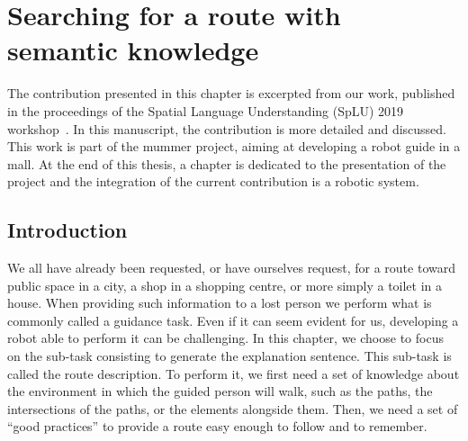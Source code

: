 \ifdefined{}
\else
\setcounter{chapter}{3} %
\dominitoc
\faketableofcontents
\fi

\chapter{Searching for a route with semantic knowledge}
\label{chap:3}
\minitoc

The contribution presented in this chapter is excerpted from our work, published in the proceedings of the Spatial Language Understanding (SpLU) 2019 workshop~\cite{sarthou_2019_semantic}. In this manuscript, the contribution is more detailed and discussed. This work is part of the \acrshort{mummer} project, aiming at developing a robot guide in a mall. At the end of this thesis, a chapter is dedicated to the presentation of the project and the integration of the current contribution is a robotic system.

\section{Introduction}

We all have already been requested, or have ourselves request, for a route toward public space in a city, a shop in a shopping centre, or more simply a toilet in a house. When providing such information to a lost person we perform what is commonly called a guidance task. Even if it can seem evident for us, developing a robot able to perform it can be challenging. In this chapter, we choose to focus on the sub-task consisting to generate the explanation sentence. This sub-task is called the route description. To perform it, we first need a set of knowledge about the environment in which the guided person will walk, such as the paths, the intersections of the paths, or the elements alongside them. Then, we need a set of ``good practices'' to provide a route easy enough to follow and to remember.


